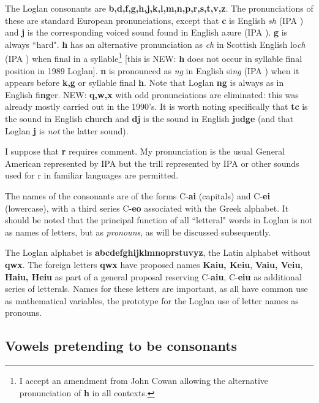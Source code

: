 \documentclass[12pt]{book}
\begin{document}
The Loglan consonants are {\bf b,d,f,g,h,j,k,l,m,n,p,r,s,t,v,z}.  The pronunciations of these are standard European pronunciations, except that {\bf c} is English {\em sh} (IPA ) and {\bf j} is the corresponding voiced sound found in English a{\em z}ure (IPA ).  {\bf g} is always ``hard".  {\bf h} has an alternative pronunciation as {\em ch} in Scottish English lo{\em ch} (IPA ) when final in a syllable\footnote{I accept an amendment from John Cowan allowing the alternative pronunciation of {\bf h} in all contexts.} [this is NEW:  {\bf h} does not occur in syllable final position in 1989 Loglan].  {\bf n} is pronounced as {\em ng} in English si{\em ng} (IPA ) when it appears before {\bf k,g} or syllable final {\bf h}.  Note that Loglan {\bf ng} is always as in English fi{\bf ng}er.  NEW:  {\bf q,w,x} with odd pronunciations are eliminated:  this was already mostly carried out in the 1990's.  It is worth noting specifically that {\bf tc} is the sound in English {\bf ch}ur{\bf ch} and {\bf dj} is the sound in English {\bf j}u{\bf dge} (and that Loglan {\bf j} is {\em not\/} the latter sound).

I suppose that {\bf r} requires comment.  My pronunciation is the usual General American represented by IPA  but the trill represented by IPA  or other sounds used for r in familiar languages are permitted.

The names of the consonants are of the forms C-{\bf ai} (capitals) and C-{\bf ei} (lowercase), with a third series C-{\bf eo} associated with the Greek alphabet.   It should be noted that the principal function of all ``letteral" words in Loglan is not as names of letters, but as {\em pronouns\/}, as will be discussed subsequently.  

The Loglan alphabet is {\bf abcdefghijklmnoprstuvyz}, the Latin alphabet without {\bf qwx}.  The foreign letters {\bf qwx}
have proposed names {\bf Kaiu, Keiu}, {\bf Vaiu, Veiu}, {\bf Haiu, Heiu} as part of a general proposal reserving C-{\bf aiu}, C-{\bf eiu} as additional series of letterals.    Names for these letters are important, as all have common use as mathematical variables, the prototype for the Loglan use of letter names as pronouns.




\subsection{Vowels pretending to be consonants}
\end{document}
